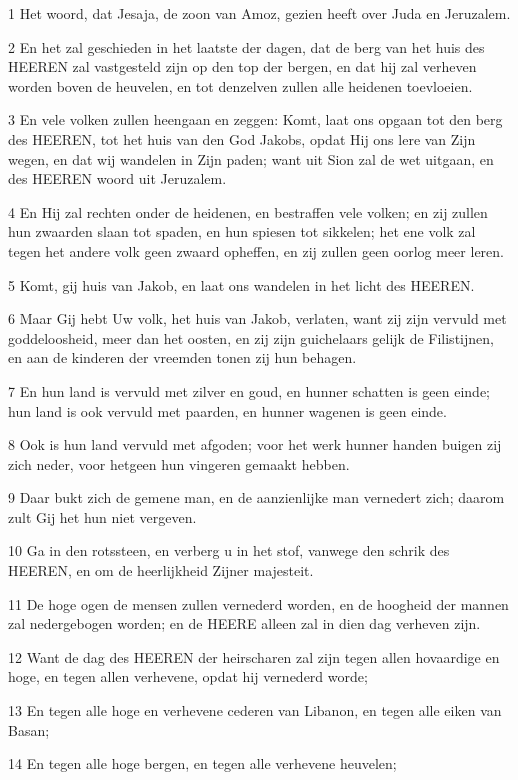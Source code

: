 \par 1 Het woord, dat Jesaja, de zoon van Amoz, gezien heeft over Juda en Jeruzalem.
\par 2 En het zal geschieden in het laatste der dagen, dat de berg van het huis des HEEREN zal vastgesteld zijn op den top der bergen, en dat hij zal verheven worden boven de heuvelen, en tot denzelven zullen alle heidenen toevloeien.
\par 3 En vele volken zullen heengaan en zeggen: Komt, laat ons opgaan tot den berg des HEEREN, tot het huis van den God Jakobs, opdat Hij ons lere van Zijn wegen, en dat wij wandelen in Zijn paden; want uit Sion zal de wet uitgaan, en des HEEREN woord uit Jeruzalem.
\par 4 En Hij zal rechten onder de heidenen, en bestraffen vele volken; en zij zullen hun zwaarden slaan tot spaden, en hun spiesen tot sikkelen; het ene volk zal tegen het andere volk geen zwaard opheffen, en zij zullen geen oorlog meer leren.
\par 5 Komt, gij huis van Jakob, en laat ons wandelen in het licht des HEEREN.
\par 6 Maar Gij hebt Uw volk, het huis van Jakob, verlaten, want zij zijn vervuld met goddeloosheid, meer dan het oosten, en zij zijn guichelaars gelijk de Filistijnen, en aan de kinderen der vreemden tonen zij hun behagen.
\par 7 En hun land is vervuld met zilver en goud, en hunner schatten is geen einde; hun land is ook vervuld met paarden, en hunner wagenen is geen einde.
\par 8 Ook is hun land vervuld met afgoden; voor het werk hunner handen buigen zij zich neder, voor hetgeen hun vingeren gemaakt hebben.
\par 9 Daar bukt zich de gemene man, en de aanzienlijke man vernedert zich; daarom zult Gij het hun niet vergeven.
\par 10 Ga in den rotssteen, en verberg u in het stof, vanwege den schrik des HEEREN, en om de heerlijkheid Zijner majesteit.
\par 11 De hoge ogen de mensen zullen vernederd worden, en de hoogheid der mannen zal nedergebogen worden; en de HEERE alleen zal in dien dag verheven zijn.
\par 12 Want de dag des HEEREN der heirscharen zal zijn tegen allen hovaardige en hoge, en tegen allen verhevene, opdat hij vernederd worde;
\par 13 En tegen alle hoge en verhevene cederen van Libanon, en tegen alle eiken van Basan;
\par 14 En tegen alle hoge bergen, en tegen alle verhevene heuvelen;
